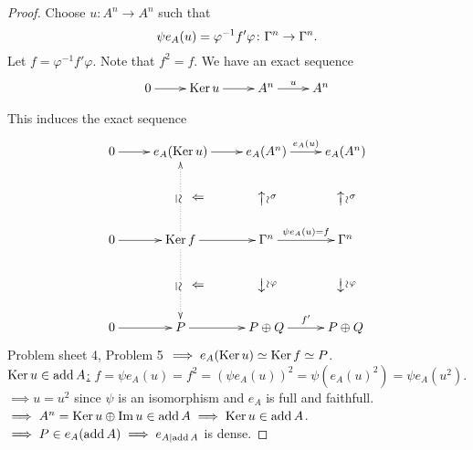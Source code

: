 \begin{proof}
Choose $u\colon A^n \to A^n $ such that \[ \psi e_A(u) = \varphi^{-1} f' \varphi \colon \Gamma^n \to \Gamma^n.\]
Let $f = \varphi^{-1} f' \varphi$. Note that $f^2 = f$. We have an exact sequence \[\xymatrix{
0 \ar[r]& \Ker u \ar[r] & A^n \ar[r]^u & A^n
}\] 


This induces the exact sequence
\[\xymatrix{
0 \ar[r] & e_A(\Ker u) \ar@{<.}[dd]="s2"|-*[@]{\simeq} \ar[r] & e_A(A^n) \ar[r]^{e_A(u)} \ar@{}[dd]="sigma"|-*[@]{\xleftarrow{\sim}}^-\sigma & e_A(A^n) \ar@{}[dd]|-*[@]{\xleftarrow{\sim}}^-\sigma\\
         &                                              &      \ar@{}[l]|-*[@]{\Rightarrow}              &\\
0 \ar[r] & \Ker f \ar@{.>}[dd]="s1"|-*[@]{\simeq} \ar[r] & \G^n \ar[r]^{\psi e_A(u) = f} \ar@{}[dd]="phi"|-*[@]{\xrightarrow{\sim}}^\varphi & \G^n \ar@{}[dd]|-*[@]{\xrightarrow{\sim}}^\varphi\\
         &                                              &      \ar@{}[l]|-*[@]{\Rightarrow}              &\\
0 \ar[r] & P \ar[r] & P \oplus Q \ar[r]^{f'} & P \oplus Q
}\]
Problem sheet 4, Problem 5 $\implies e_A(\operatorname{Ker}\nolimits u) \simeq \operatorname{Ker}\nolimits f \simeq P$.\\
\underline{$\operatorname{Ker}\nolimits u \in \operatorname{add} A$:} $f = \psi e_A(u) = f^2 = (\psi e_A(u))^2 = \psi(e_A(u)^2) = \psi e_A(u^2)$.\\
$\implies u = u^2$ since $\psi$ is an isomorphism and $e_A$ is full and faithfull. \\
$\implies A^n = \operatorname{Ker}\nolimits u \oplus \operatorname{Im}\nolimits u\in \operatorname{add} A \implies \operatorname{Ker}\nolimits u \in \operatorname{add} A$.\\
$\implies P \in e_A(\operatorname{add} A) \implies e_{A \mid \operatorname{add} A}$ is dense.
\end{proof}


